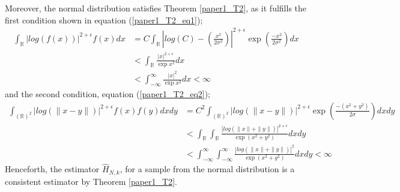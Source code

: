 \documentclass{report}
\begin{document}
Moreover, the normal distribution satisfies Theorem \ref{paper1_T2}, as it fulfills the first condition shown in equation (\ref{paper1_T2_eq1});
\begin{align} \nonumber
\int_{\mathbb{R}} | log(f(x))|^{2 + \epsilon} f(x) dx  &= C \int_{\mathbb{R}} \left| log \left( C \right) -  \left( \frac{x^2}{2\sigma^2} \right) \right|^{2 + \epsilon} \exp{ \left( \frac{-x^2}{2\sigma^2} \right)} dx \\ \nonumber
&< \int_{\mathbb{R}} \frac{|x|^{2 + \epsilon}}{ \exp{x^2}} dx \\ \nonumber
&< \int_{-\infty}^{\infty} \frac{|x|^2}{ \exp{x^2}} dx < \infty \nonumber
\end{align}
and the second condition, equation (\ref{paper1_T2_eq2});
\begin{align} \nonumber
\int_{(\mathbb{R})^2} | log(\|x-y\|)|^{2+ \epsilon} f(x) f(y) dx dy  &= C^2 \int_{(\mathbb{R})^2} | log(\|x-y\|)|^{2+ \epsilon} \exp{\left(\frac{-(x^2 + y^2)}{2 \sigma}\right)} dx dy \\ \nonumber
&< \int_{\mathbb{R}} \int_{\mathbb{R}} \frac{| log(\|x\| + \|y\|)|^{2+ \epsilon}}{\exp{(x^2 + y^2)}} dx dy \\ \nonumber
&< \int_{-\infty}^{\infty} \int_{-\infty}^{\infty} \frac{| log(\|x\| + \|y\|)|^2}{\exp{(x^2 + y^2)}} dx dy < \infty  \nonumber
\end{align}
Henceforth, the estimator $\hat{H}_{N,k}$, for a sample from the normal distribution is a consistent estimator by Theorem \ref{paper1_T2}. 
\end{document}
